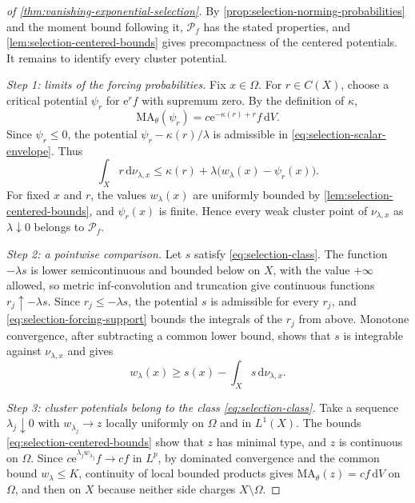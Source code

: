 \begin{proof}[of \cref{thm:vanishing-exponential-selection}]
By \cref{prop:selection-norming-probabilities} and the moment bound following it, $\mathcal P_f$ has the stated properties, and \cref{lem:selection-centered-bounds} gives precompactness of the centered potentials. It remains to identify every cluster potential.

\emph{Step 1: limits of the forcing probabilities.} Fix $x\in\Omega$. For $r\in C(X)$, choose a critical potential $\psi_r$ for $\mathrm{e}^r f$ with supremum zero. By the definition of $\kappa$,
\[
 \mathrm{MA}_\theta(\psi_r)
       =c\mathrm{e}^{-\kappa(r)+r}f\,\mathrm{d}V.
\]
Since $\psi_r\leq0$, the potential $\psi_r-\kappa(r)/\lambda$ is admissible in \eqref{eq:selection-scalar-envelope}. Thus
\begin{equation}\label{eq:selection-forcing-limit}
 \int_Xr\,\mathrm{d}\nu_{\lambda,x}
       \leq\kappa(r)+\lambda\bigl(w_\lambda(x)-\psi_r(x)\bigr).
\end{equation}
For fixed $x$ and $r$, the values $w_\lambda(x)$ are uniformly bounded by \cref{lem:selection-centered-bounds}, and $\psi_r(x)$ is finite. Hence every weak cluster point of $\nu_{\lambda,x}$ as $\lambda\downarrow0$ belongs to $\mathcal P_f$.

\emph{Step 2: a pointwise comparison.} Let $s$ satisfy \eqref{eq:selection-class}. The function $-\lambda s$ is lower semicontinuous and bounded below on $X$, with the value $+\infty$ allowed, so metric inf-convolution and truncation give continuous functions $r_j\uparrow-\lambda s$. Since $r_j\leq-\lambda s$, the potential $s$ is admissible for every $r_j$, and \eqref{eq:selection-forcing-support} bounds the integrals of the $r_j$ from above. Monotone convergence, after subtracting a common lower bound, shows that $s$ is integrable against $\nu_{\lambda,x}$ and gives
\begin{equation}\label{eq:selection-pointwise-comparison}
 w_\lambda(x)\geq s(x)-\int_Xs\,\mathrm{d}\nu_{\lambda,x}.
\end{equation}

\emph{Step 3: cluster potentials belong to the class \eqref{eq:selection-class}.} Take a sequence $\lambda_j\downarrow0$ with $w_{\lambda_j}\to z$ locally uniformly on $\Omega$ and in $L^1(X)$. The bounds \eqref{eq:selection-centered-bounds} show that $z$ has minimal type, and $z$ is continuous on $\Omega$. Since $c\mathrm{e}^{\lambda_j w_{\lambda_j}}f\to cf$ in $L^p$, by dominated convergence and the common bound $w_\lambda\leq K$, continuity of local bounded products gives $\mathrm{MA}_\theta(z)=cf\,\mathrm{d}V$ on $\Omega$, and then on $X$ because neither side charges $X\setminus\Omega$.


\end{proof}
